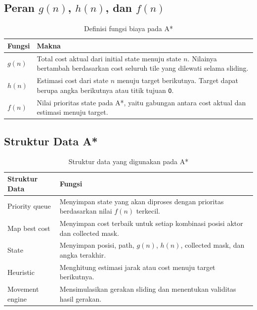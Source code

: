 \subsection{Peran $g(n)$, $h(n)$, dan $f(n)$}

\begin{table}[H]
	\centering
	\caption{Definisi fungsi biaya pada A*}
	\begin{tabular}{|p{3cm}|p{11cm}|}
		\hline
		\rowcolor{red!15}
		\textbf{Fungsi} & \textbf{Makna} \\
		\hline
		$g(n)$ & Total cost aktual dari initial state menuju state $n$. Nilainya bertambah berdasarkan cost seluruh tile yang dilewati selama sliding. \\
		\hline
		$h(n)$ & Estimasi cost dari state $n$ menuju target berikutnya. Target dapat berupa angka berikutnya atau titik tujuan \texttt{O}. \\
		\hline
		$f(n)$ & Nilai prioritas state pada A*, yaitu gabungan antara cost aktual dan estimasi menuju target. \\
		\hline
	\end{tabular}
\end{table}

\subsection{Struktur Data A*}

\begin{table}[H]
	\centering
	\caption{Struktur data yang digunakan pada A*}
	\begin{tabular}{|p{4cm}|p{10cm}|}
		\hline
		\rowcolor{red!15}
		\textbf{Struktur Data} & \textbf{Fungsi} \\
		\hline
		Priority queue & Menyimpan state yang akan diproses dengan prioritas berdasarkan nilai $f(n)$ terkecil. \\
		\hline
		Map best cost & Menyimpan cost terbaik untuk setiap kombinasi posisi aktor dan collected mask. \\
		\hline
		State & Menyimpan posisi, path, $g(n)$, $h(n)$, collected mask, dan angka terakhir. \\
		\hline
		Heuristic & Menghitung estimasi jarak atau cost menuju target berikutnya. \\
		\hline
		Movement engine & Mensimulasikan gerakan sliding dan menentukan validitas hasil gerakan. \\
		\hline
	\end{tabular}
\end{table}

